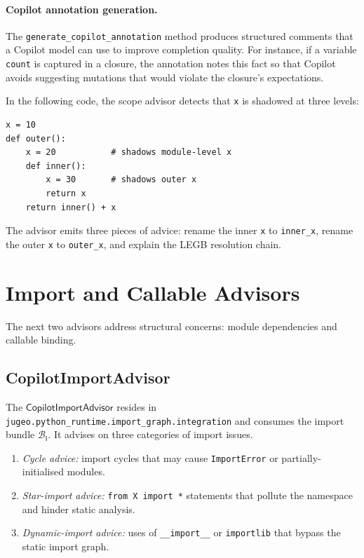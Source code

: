 \documentclass[11pt]{article}
\newcommand{\ImportBundle}{\mathcal{B}_{\mathsf{I}}}
\begin{document}
\paragraph{Copilot annotation generation.}
The \texttt{generate\_copilot\_annotation} method produces structured
comments that a Copilot model can use to improve completion quality.
For instance, if a variable \texttt{count} is captured in a closure,
the annotation notes this fact so that Copilot avoids suggesting
mutations that would violate the closure's expectations.

\begin{example}\label{ex:scope}
In the following code, the scope advisor detects that \texttt{x} is
shadowed at three levels:
\begin{lstlisting}[style=jugeo-python]
x = 10
def outer():
    x = 20           # shadows module-level x
    def inner():
        x = 30       # shadows outer x
        return x
    return inner() + x
\end{lstlisting}
The advisor emits three pieces of advice: rename the inner \texttt{x}
to \texttt{inner\_x}, rename the outer \texttt{x} to
\texttt{outer\_x}, and explain the LEGB resolution chain.
\end{example}

\section{Import and Callable Advisors}\label{sec:import-callable}

The next two advisors address structural concerns: module dependencies
and callable binding.

\subsection{CopilotImportAdvisor}\label{sec:import-advisor}

The $\mathsf{CopilotImportAdvisor}$ resides in
\texttt{jugeo.python\_runtime.import\_graph.integration} and consumes
the import bundle $\ImportBundle$.  It advises on three categories of
import issues.

\begin{definition}\label{def:import-cat}
\begin{enumerate}
  \item \emph{Cycle advice:} import cycles that may cause
    \texttt{ImportError} or partially-initialised modules.
  \item \emph{Star-import advice:} \texttt{from X import *} statements
    that pollute the namespace and hinder static analysis.
  \item \emph{Dynamic-import advice:} uses of \texttt{\_\_import\_\_}
    or \texttt{importlib} that bypass the static import graph.
\end{enumerate}
\end{definition}
\end{document}
